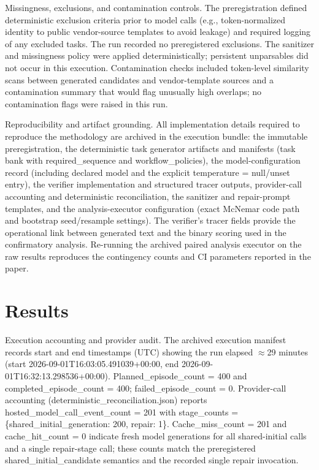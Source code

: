 \documentclass[conference]{IEEEtran}
\begin{document}
Missingness, exclusions, and contamination controls. The preregistration defined deterministic exclusion criteria prior to model calls (e.g., token-normalized identity to public vendor-source templates to avoid leakage) and required logging of any excluded tasks. The run recorded no preregistered exclusions. The sanitizer and missingness policy were applied deterministically; persistent unparsables did not occur in this execution. Contamination checks included token-level similarity scans between generated candidates and vendor-template sources and a contamination summary that would flag unusually high overlaps; no contamination flags were raised in this run.

Reproducibility and artifact grounding. All implementation details required to reproduce the methodology are archived in the execution bundle: the immutable preregistration, the deterministic task generator artifacts and manifests (task bank with required\_sequence and workflow\_policies), the model-configuration record (including declared model and the explicit temperature = null/unset entry), the verifier implementation and structured tracer outputs, provider-call accounting and deterministic reconciliation, the sanitizer and repair-prompt templates, and the analysis-executor configuration (exact McNemar code path and bootstrap seed/resample settings). The verifier's tracer fields provide the operational link between generated text and the binary scoring used in the confirmatory analysis. Re-running the archived paired analysis executor on the raw results reproduces the contingency counts and CI parameters reported in the paper.

\section{Results}
Execution accounting and provider audit. The archived execution manifest records start and end timestamps (UTC) showing the run elapsed \ensuremath{\approx}29 minutes (start 2026-09-01T16:03:05.491039+00:00, end 2026-09-01T16:32:13.298536+00:00). Planned\_episode\_count = 400 and completed\_episode\_count = 400; failed\_episode\_count = 0. Provider-call accounting (deterministic\_reconciliation.json) reports hosted\_model\_call\_event\_count = 201 with stage\_counts = \{shared\_initial\_generation: 200, repair: 1\}. Cache\_miss\_count = 201 and cache\_hit\_count = 0 indicate fresh model generations for all shared-initial calls and a single repair-stage call; these counts match the preregistered shared\_initial\_candidate semantics and the recorded single repair invocation.
\end{document}
